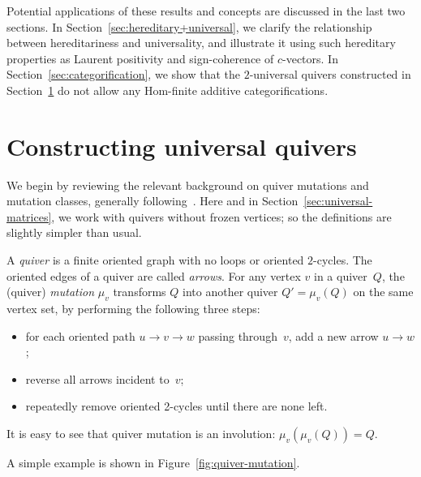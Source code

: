 Potential applications of these results and concepts are discussed 
in the last two sections. 
In Section~\ref{sec:hereditary+universal}, we clarify the relationship between hereditariness and universality, 
and illustrate it using such hereditary properties as 
Laurent positivity and sign-coherence of $c$-vectors. 
In Section~\ref{sec:categorification}, 
we show that the $2$-universal quivers constructed in 
Section~\ref{sec:constructing-universal-quivers}
do not allow any Hom-finite additive categorifications. 


\section{Constructing universal quivers}
\label{sec:constructing-universal-quivers}

We begin by reviewing the relevant background on quiver mutations and mutation classes, generally following~\cite[Sections~2.1, 2.6, 4.1]{FWZ}. 
Here and in Section~\ref{sec:universal-matrices}, 
we work with quivers without frozen vertices; so the definitions are slightly simpler than usual. 

\begin{definition}
\label{def:quiver-mutation}
A \emph{quiver} is a finite oriented graph with no loops or oriented $2$-cycles. The oriented edges of a quiver are called \emph{arrows}. For any vertex $v$ in a quiver~$Q$, the (quiver) \emph{mutation} $\mu_v$ transforms $Q$ into another quiver $Q'=\mu_v(Q)$ on the same vertex set, by performing the following three steps:
\begin{itemize} %
\item
for each oriented path $u\to v\to w$ passing through~$v$, add a new arrow
$u\to w$; 
\item
reverse all arrows incident to~$v$; 
\item
repeatedly remove oriented 2-cycles until there are none left.
\end{itemize}
\end{definition}

It is easy to see that quiver mutation is an involution: $\mu_v(\mu_v(Q))=Q$. 

A simple example is shown in Figure~\ref{fig:quiver-mutation}. 

